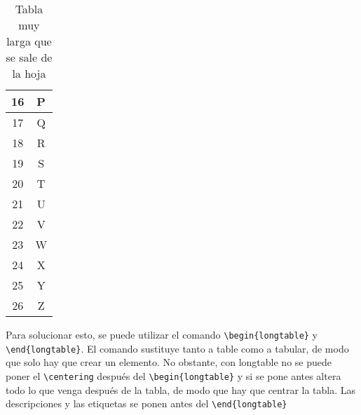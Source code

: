 \begin{table}[H]
\begin{tabular}{|c|c|}
		\hline
		16 & P \\
		\hline
		17 & Q \\
		\hline
		18 & R \\
		\hline
		19 & S \\
		\hline
		20 & T \\
		\hline
		21 & U \\
		\hline
		22 & V \\
		\hline
		23 & W \\
		\hline
		24 & X \\
		\hline
		25 & Y \\
		\hline
		26 & Z \\
		\hline
	\end{tabular}
	\caption[Tabla muy larga]{Tabla muy larga que se sale de la hoja}
	\label{table_3}
\end{table}

Para solucionar esto, se puede utilizar el comando \verb!\begin{longtable}! y \verb!\end{longtable}!. El comando sustituye tanto a table como a tabular, de modo que solo hay que crear un elemento. No obstante, con longtable no se puede poner el \verb!\centering! después del \verb!\begin{longtable}! y si se pone antes altera todo lo que venga después de la tabla, de modo que hay que centrar la tabla. Las descripciones y las etiquetas se ponen antes del \verb!\end{longtable}!

